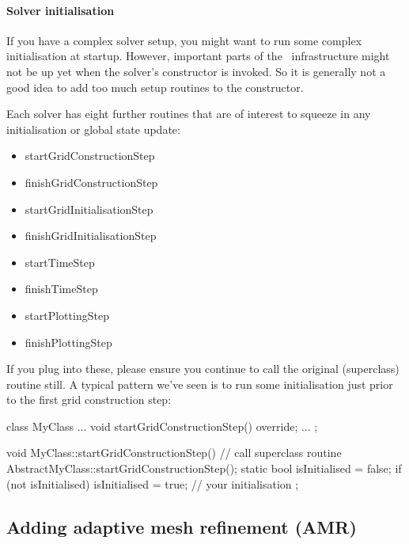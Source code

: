 \paragraph{Solver initialisation}

If you have a complex solver setup, you might want to run some complex
initialisation at startup.
However, important parts of the \ExaHyPE\ infrastructure might not be up yet
when the solver's constructor is invoked.
So it is generally not a good idea to add too much setup routines to the
constructor.


Each solver has eight further routines that are of interest to squeeze in any
initialisation or global state update:

\begin{itemize}
  \item startGridConstructionStep
  \item finishGridConstructionStep
  \item startGridInitialisationStep
  \item finishGridInitialisationStep
  \item startTimeStep
  \item finishTimeStep
  \item startPlottingStep
  \item finishPlottingStep   
\end{itemize}


\noindent
If you plug into these, please ensure you continue to call the original
(superclass) routine still.
A typical pattern we've seen is to run some initialisation just prior to the
first grid construction step:

\begin{code}
class MyClass ... {
  void startGridConstructionStep() override;
  ...
};
\end{code}



\begin{code}
void MyClass::startGridConstructionStep() {
  // call superclass routine
  AbstractMyClass::startGridConstructionStep();
  static bool isInitialised = false;
  if (not isInitialised) {
    isInitialised = true;
    // your initialisation
  }
};
\end{code}



\subsection{Adding adaptive mesh refinement (AMR)}


